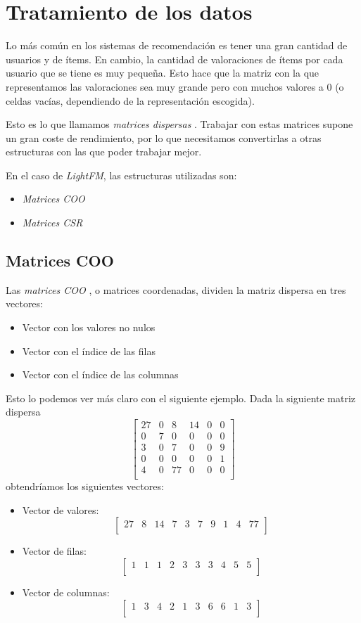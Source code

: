 \section{Tratamiento de los datos}\label{tratamiento-datos}
Lo más común en los sistemas de recomendación es tener una gran cantidad de usuarios y de ítems. En cambio, la cantidad de valoraciones de ítems por cada usuario que se tiene es muy pequeña. Esto hace que la matriz con la que representamos las valoraciones sea muy grande pero con muchos valores a 0 (o celdas vacías, dependiendo de la representación escogida).  

Esto es lo que llamamos \textit{matrices dispersas} \cite{wiki:Sparse_matrix}. Trabajar con estas matrices supone un gran coste de rendimiento, por lo que necesitamos convertirlas a otras estructuras con las que poder trabajar mejor.

En el caso de \textit{LightFM}, las estructuras utilizadas son:
\begin{itemize}
\tightlist
\item \textit{Matrices COO}
\item \textit{Matrices CSR}  
\end{itemize}

\subsection{Matrices COO}\label{matrices-coo}
Las \textit{matrices COO} \cite{coo-matrix}, o matrices coordenadas, dividen la matriz dispersa en tres vectores:
\begin{itemize}
\tightlist
\item Vector con los valores no nulos
\item Vector con el índice de las filas
\item Vector con el índice de las columnas
\end{itemize}
Esto lo podemos ver más claro con el siguiente ejemplo. Dada la siguiente matriz dispersa
\[\begin{bmatrix}
27&0&8&14&0&0\\
0&7&0&0&0&0\\
3&0&7&0&0&9\\
0&0&0&0&0&1\\
4&0&77&0&0&0\\
\end{bmatrix}\]
obtendríamos los siguientes vectores:
\begin{itemize}
\tightlist
\item Vector de valores: \[\begin{bmatrix} 27&8&14&7&3&7&9&1&4&77\\\end{bmatrix}\]
\item Vector de filas: \[\begin{bmatrix} 1&1&1&2&3&3&3&4&5&5\\\end{bmatrix}\]
\item Vector de columnas: \[\begin{bmatrix} 1&3&4&2&1&3&6&6&1&3\\
\end{bmatrix}\]
\end{itemize}

